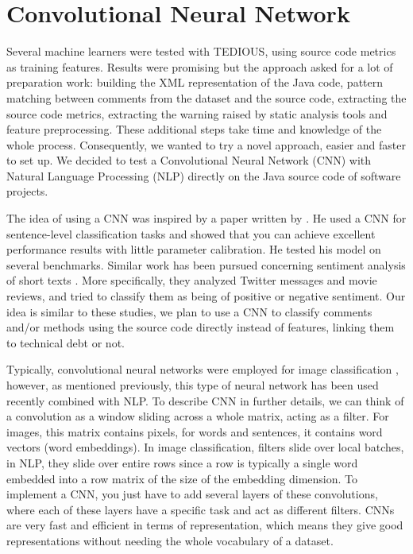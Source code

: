 \label{sec:Theme3}


%	
%

\section{Convolutional Neural Network}


Several machine learners were tested with TEDIOUS, using source code metrics as training features. Results were promising but the approach asked for a lot of preparation work: building the XML representation of the Java code, pattern matching between comments from the dataset and the source code, extracting the source code metrics, extracting the warning raised by static analysis tools and feature preprocessing. These additional steps take time and knowledge of the whole process. Consequently, we wanted to try a novel approach, easier and faster to set up. We decided to test a Convolutional Neural Network (CNN) with Natural Language Processing (NLP) directly on the Java source code of software projects.

The idea of using a CNN was inspired by a paper written by \citet{kim2014convolutional}. He used a CNN for sentence-level classification tasks and showed that you can achieve excellent performance results with little parameter calibration. He tested his model on several benchmarks. Similar work has been pursued concerning sentiment analysis of short texts \citep{dos2014deep}. More specifically, they analyzed Twitter messages and movie reviews, and tried to classify them as being of positive or negative sentiment. Our idea is similar to these studies, we plan to use a CNN to classify comments and/or methods using the source code directly instead of features, linking them to technical debt or not.

Typically, convolutional neural networks were employed for image classification \citep{krizhevsky2012imagenet}, however, as mentioned previously, this type of neural network has been used recently combined with NLP. To describe CNN in further details, we can think of a convolution as a window sliding across a whole matrix, acting as a filter. For images, this matrix contains pixels, for words and sentences, it contains word vectors (word embeddings). In image classification, filters slide over local batches, in NLP, they slide over entire rows since a row is typically a single word embedded into a row matrix of the size of the embedding dimension. To implement a CNN, you just have to add several layers of these convolutions, where each of these layers have a specific task and act as different filters. CNNs are very fast and efficient in terms of representation, which means they give good representations without needing the whole vocabulary of a dataset.

